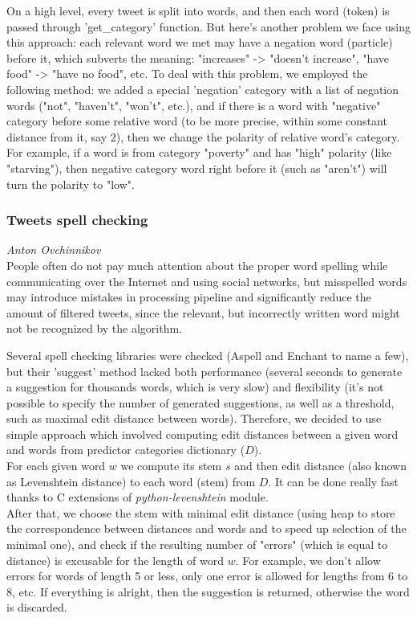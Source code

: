 On a high level, every tweet is split into words, and then each word (token) is passed through 'get\_category' function. But here's another problem we face using this approach: each relevant word we met may have a negation word (particle) before it, which subverts the meaning: "increases" -> "doesn't increase", "have food" -> "have no food", etc. To deal with this problem, we employed the following method: we added a special 'negation' category with a list of negation words ("not", "haven't", "won't", etc.), and if there is a word with "negative" category before some relative word (to be more precise, within some constant distance from it, say 2), then we change the polarity of relative word's category. For example, if a word is from category "poverty" and has "high" polarity (like "starving"), then negative category word right before it (such as "aren't") will turn the polarity to "low".


\subsubsection*{Tweets spell checking}
\emph{Anton Ovchinnikov} \\
People often do not pay much attention about the proper word spelling while communicating over the Internet and using social networks, but misspelled words may introduce mistakes in processing pipeline and significantly reduce the amount of filtered tweets, since the relevant, but incorrectly written word might not be recognized by the algorithm.

Several spell checking libraries were checked (Aspell and Enchant to name a few), but their 'suggest' method lacked both performance (several seconds to generate a suggestion for thousands words, which is very slow) and flexibility (it's not possible to specify the number of generated suggestions, as well as a threshold, such as maximal edit distance between words). Therefore, we decided to use simple approach which involved computing edit distances between a given word and words from predictor categories dictionary ($D$).
\\
For each given word $w$ we compute its stem $s$ and then edit distance (also known as Levenshtein distance) to each word (stem) from $D$. It can be done really fast thanks to C extensions of \textit{python-levenshtein} module.
\\
After that, we choose the stem with minimal edit distance (using heap to store the correspondence between distances and words and to speed up selection of the minimal one), and check if the resulting number of "errors" (which is equal to distance) is excusable for the length of word $w$. For example, we don't allow errors for words of length 5 or less, only one error is allowed for lengths from 6 to 8, etc. If everything is alright, then the suggestion is returned, otherwise the word is discarded.

